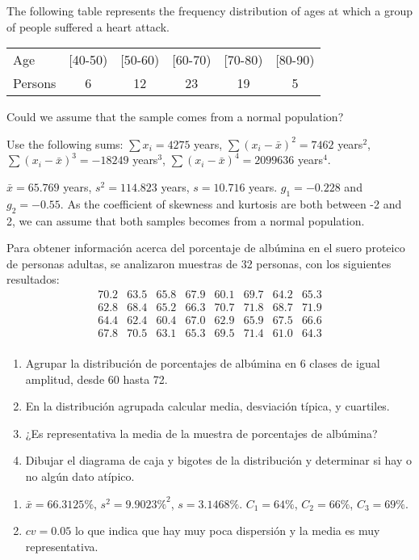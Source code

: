 {The following table represents the frequency distribution of ages at which a group of people suffered a heart
attack.
\begin{center}
\begin{tabular}{lccccc}
\toprule
Age & [40-50) & [50-60) & [60-70) & [70-80) & [80-90)  \\
Persons & 6 & 12 & 23 & 19 & 5  \\
\bottomrule
\end{tabular}
\end{center}

Could we assume that the sample comes from a normal population?

Use the following sums: $\sum x_i= 4275$ years, $\sum (x_i-\bar x)^2=7462$ years$^2$, $\sum (x_i-\bar x)^3=-18249$
years$^3$, $\sum (x_i-\bar x)^4=2099636$ years$^4$.
}
{
$\bar x= 65.769$ years, $s^2= 114.823$ years, $s=10.716$ years. $g_1=-0.228$ and $g_2=-0.55$. 
As the coefficient of skewness and kurtosis are both between -2 and 2, we can assume that both samples becomes from a normal population.
}
{}


{Para obtener información acerca del porcentaje de albúmina en el suero proteico de personas adultas, se analizaron muestras de 32 personas, con los siguientes resultados:
\[
\begin{array}{cccccccc}
70.2 & 63.5 & 65.8 & 67.9 & 60.1 & 69.7 & 64.2 & 65.3 \\
62.8 & 68.4 & 65.2 & 66.3 & 70.7 & 71.8 & 68.7 & 71.9 \\
64.4 & 62.4 & 60.4 & 67.0 & 62.9 & 65.9 & 67.5 & 66.6 \\
67.8 & 70.5 & 63.1 & 65.3 & 69.5 & 71.4 & 61.0 & 64.3 \\
\end{array}
\]
\begin{enumerate}
\item Agrupar la distribución de porcentajes de albúmina en 6 clases de igual amplitud, desde 60 hasta 72.
\item En la distribución agrupada calcular media, desviación típica, y cuartiles.
\item ¿Es representativa la media de la muestra de porcentajes de albúmina?
\item Dibujar el diagrama de caja y bigotes de la distribución y determinar si hay o no algún dato atípico.
\end{enumerate}
}
{\begin{enumerate}[start=2]
\item $\bar x=66.3125\%$, $s^2=9.9023\%^2$, $s=3.1468\%$. $C_1=64\%$, $C_2=66\%$, $C_3=69\%$.
\item $cv=0.05$ lo que indica que hay muy poca dispersión y la media es muy representativa.
\end{enumerate}
}
{}


